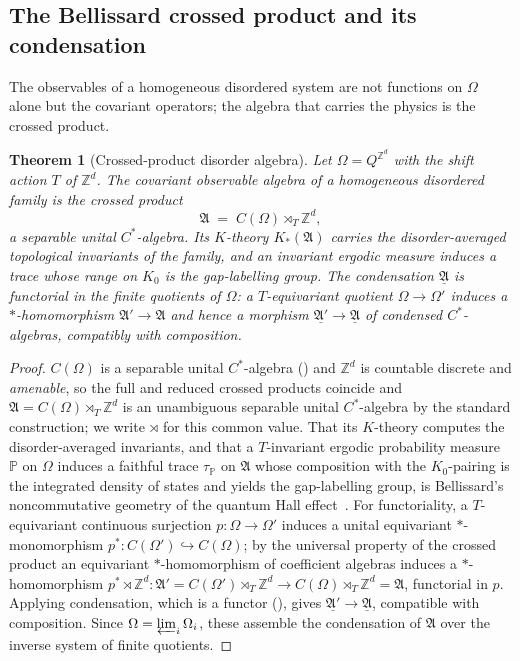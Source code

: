 \documentclass[12pt]{article}
\newcommand{\cond}[1]{\underline{#1}}          %
\newcommand{\dis}{\Omega}                       %
\newcommand{\dalg}{\mathfrak{A}}               %
\newcommand{\ZZ}{\mathbb{Z}}
\theoremstyle{plain}
\newtheorem{progthm}{Theorem}
\begin{document}
\subsection{The Bellissard crossed product and its condensation}

The observables of a homogeneous disordered system are not functions on $\dis$ alone
but the covariant operators; the algebra that carries the physics is the crossed
product.

\begin{progthm}[Crossed-product disorder algebra]
\label{thm:crossed}
Let $\dis=Q^{\ZZ^{d}}$ with the shift action $T$ of $\ZZ^{d}$. The covariant
observable algebra of a homogeneous disordered family is the crossed product
\[
  \dalg \;=\; C(\dis)\rtimes_{T}\ZZ^{d},
\]
a separable unital $C^{*}$-algebra. Its $K$-theory $K_{\ast}(\dalg)$ carries the
disorder-averaged topological invariants of the family, and an invariant ergodic
measure induces a trace whose range on $K_{0}$ is the gap-labelling group. The
condensation $\cond{\dalg}$ is functorial in the finite quotients of $\dis$: a
$T$-equivariant quotient $\dis\to\dis'$ induces a $\ast$-homomorphism
$\dalg'\to\dalg$ and hence a morphism $\cond{\dalg'}\to\cond{\dalg}$ of condensed
$C^{*}$-algebras, compatibly with composition.
\end{progthm}

\begin{proof}
$C(\dis)$ is a separable unital $C^{*}$-algebra () and $\ZZ^{d}$ is
countable discrete and \emph{amenable}, so the full and reduced crossed products
coincide and $\dalg=C(\dis)\rtimes_{T}\ZZ^{d}$ is an unambiguous separable unital
$C^{*}$-algebra by the standard construction; we write $\rtimes$ for this common
value. That its
$K$-theory computes the disorder-averaged invariants, and that a $T$-invariant
ergodic probability measure $\mathbb{P}$ on $\dis$ induces a faithful trace
$\tau_{\mathbb{P}}$ on $\dalg$ whose composition with the $K_{0}$-pairing is the
integrated density of states and yields the gap-labelling group, is Bellissard's
noncommutative geometry of the quantum Hall
effect~\mbox{\cite{bellissard-ncg-qhe,kellendonk-tilings,prodan-sb}}. For functoriality, a
$T$-equivariant continuous surjection $p:\dis\to\dis'$ induces a unital equivariant
$\ast$-monomorphism $p^{*}:C(\dis')\hookrightarrow C(\dis)$; by the universal
property of the crossed product an equivariant $\ast$-homomorphism of coefficient
algebras induces a $\ast$-homomorphism
$p^{*}\rtimes\ZZ^{d}:\dalg'=C(\dis')\rtimes_{T}\ZZ^{d}\to C(\dis)\rtimes_{T}\ZZ^{d}=\dalg$,
functorial in $p$. Applying condensation, which is a functor
(), gives $\cond{\dalg'}\to\cond{\dalg}$, compatible with
composition. Since $\dis=\varprojlim_{i}\dis_{i}$, these assemble the condensation of
$\dalg$ over the inverse system of finite quotients.
\end{proof}
\end{document}
